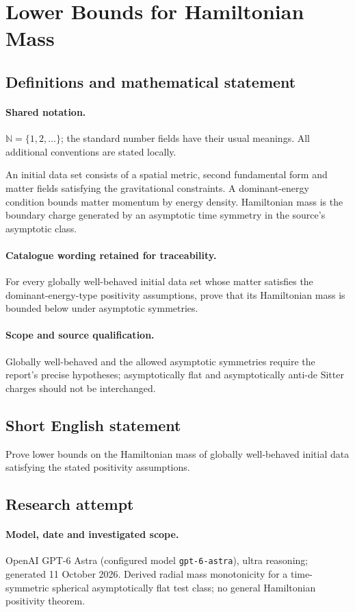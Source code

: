 \documentclass[11pt]{article}
\begin{document}
\section{Lower Bounds for Hamiltonian Mass}\label{statement}

\subsection{Definitions and mathematical statement}

\paragraph{Shared notation.}$\mathbb N=\{1,2,\ldots\}$; the standard number fields have their usual meanings. All additional conventions are stated locally.


An initial data set consists of a spatial metric, second fundamental form and matter fields satisfying the gravitational constraints. A dominant-energy condition bounds matter momentum by energy density. Hamiltonian mass is the boundary charge generated by an asymptotic time symmetry in the source's asymptotic class.

\paragraph{Catalogue wording retained for traceability.}
For every globally well-behaved initial data set whose matter satisfies the dominant-energy-type positivity assumptions, prove that its Hamiltonian mass is bounded below under asymptotic symmetries.

\paragraph{Scope and source qualification.}Globally well-behaved and the allowed asymptotic symmetries require the report's precise hypotheses; asymptotically flat and asymptotically anti-de Sitter charges should not be interchanged.
\subsection{Short English statement}
Prove lower bounds on the Hamiltonian mass of globally well-behaved initial data satisfying the stated positivity assumptions.
\subsection{Research attempt}
\paragraph{Model, date and investigated scope.}
OpenAI GPT-6 Astra (configured model \texttt{gpt-6-astra}), ultra reasoning; generated 11 October 2026. Derived radial mass monotonicity for a time-symmetric spherical asymptotically flat test class; no general Hamiltonian positivity theorem.
\end{document}
